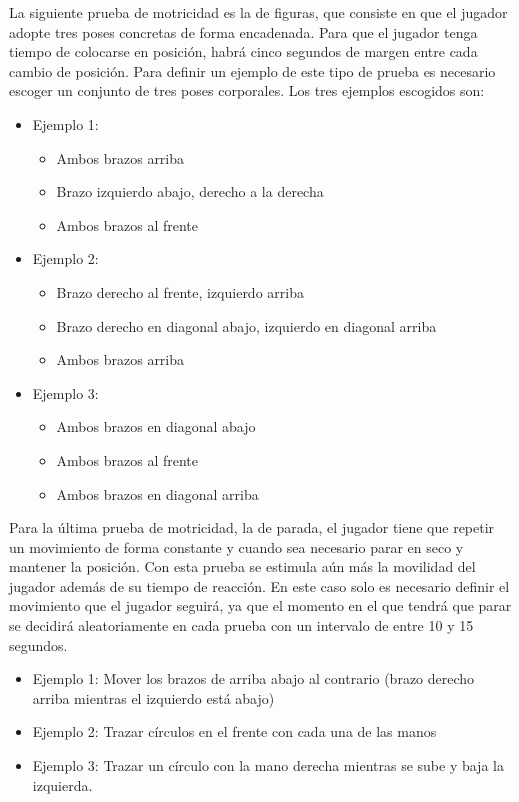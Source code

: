 La siguiente prueba de motricidad es la de figuras, que consiste en que el jugador adopte tres poses concretas de forma encadenada. Para que el jugador tenga tiempo de colocarse en posición, habrá cinco segundos de margen entre cada cambio de posición. Para definir un ejemplo de este tipo de prueba es necesario escoger un conjunto de tres poses corporales. Los tres ejemplos escogidos son:
	
\begin{itemize}
    	
    \item {Ejemplo 1: 
    \begin{itemize}
        \item {Ambos brazos arriba}
        \item {Brazo izquierdo abajo, derecho a la derecha}
        \item {Ambos brazos al frente}
    \end{itemize}}
    \item {Ejemplo 2:
    \begin{itemize}
        \item {Brazo derecho al frente, izquierdo arriba}
        \item {Brazo derecho en diagonal abajo, izquierdo en diagonal arriba}
        \item {Ambos brazos arriba}
    \end{itemize}}
    \item {Ejemplo 3:
    \begin{itemize}
        \item {Ambos brazos en diagonal abajo}
        \item {Ambos brazos al frente}
        \item {Ambos brazos en diagonal arriba}
    \end{itemize}}

\end{itemize}

Para la última prueba de motricidad, la de parada, el jugador tiene que repetir un movimiento de forma constante y cuando sea necesario parar en seco y mantener la posición. Con esta prueba se estimula aún más la movilidad del jugador además de su tiempo de reacción. En este caso solo es necesario definir el movimiento que el jugador seguirá, ya que el momento en el que tendrá que parar se decidirá aleatoriamente en cada prueba con un intervalo de entre 10 y 15 segundos.


\begin{itemize}
    \item {Ejemplo 1: Mover los brazos de arriba abajo al contrario (brazo derecho arriba mientras el izquierdo está abajo)}
    \item {Ejemplo 2: Trazar círculos en el frente con cada una de las manos}
    \item {Ejemplo 3: Trazar un círculo con la mano derecha mientras se sube y baja la izquierda.}
\end{itemize}


